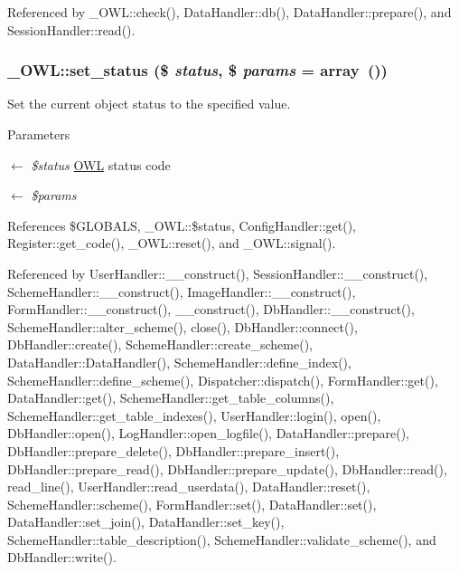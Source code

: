 Referenced by \_\-OWL::check(), DataHandler::db(), DataHandler::prepare(), and SessionHandler::read().

\subsubsection[{set\_\-status}]{\setlength{\rightskip}{0pt plus 5cm}\_\-OWL::set\_\-status (\$ {\em status}, \/  \$ {\em params} = {\ttfamily array~()})}\label{class__OWL_aea912d0ede9b3c2a69b79072d94d4787}
Set the current object status to the specified value.


\begin{DoxyParams}{Parameters}
\item[\mbox{$\leftarrow$} {\em \$status}]\hyperlink{classOWL}{OWL} status code \item[\mbox{$\leftarrow$} {\em \$params}]\end{DoxyParams}


References \$GLOBALS, \_\-OWL::\$status, ConfigHandler::get(), Register::get\_\-code(), \_\-OWL::reset(), and \_\-OWL::signal().



Referenced by UserHandler::\_\-\_\-construct(), SessionHandler::\_\-\_\-construct(), SchemeHandler::\_\-\_\-construct(), ImageHandler::\_\-\_\-construct(), FormHandler::\_\-\_\-construct(), \_\-\_\-construct(), DbHandler::\_\-\_\-construct(), SchemeHandler::alter\_\-scheme(), close(), DbHandler::connect(), DbHandler::create(), SchemeHandler::create\_\-scheme(), DataHandler::DataHandler(), SchemeHandler::define\_\-index(), SchemeHandler::define\_\-scheme(), Dispatcher::dispatch(), FormHandler::get(), DataHandler::get(), SchemeHandler::get\_\-table\_\-columns(), SchemeHandler::get\_\-table\_\-indexes(), UserHandler::login(), open(), DbHandler::open(), LogHandler::open\_\-logfile(), DataHandler::prepare(), DbHandler::prepare\_\-delete(), DbHandler::prepare\_\-insert(), DbHandler::prepare\_\-read(), DbHandler::prepare\_\-update(), DbHandler::read(), read\_\-line(), UserHandler::read\_\-userdata(), DataHandler::reset(), SchemeHandler::scheme(), FormHandler::set(), DataHandler::set(), DataHandler::set\_\-join(), DataHandler::set\_\-key(), SchemeHandler::table\_\-description(), SchemeHandler::validate\_\-scheme(), and DbHandler::write().

